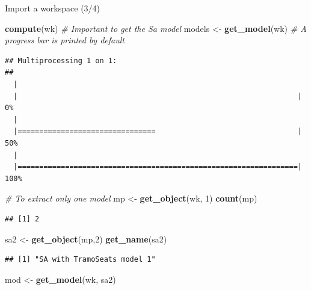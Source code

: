 \documentclass[10pt,xcolor=table,color={dvipsnames,usenames},ignorenonframetext,usepdftitle=false,french]{beamer}
\newenvironment{Shaded}{\begin{snugshade}}{\end{snugshade}}
\newcommand{\CommentTok}[1]{\textcolor[rgb]{0.56,0.35,0.01}{\textit{#1}}}
\newcommand{\DecValTok}[1]{\textcolor[rgb]{0.00,0.00,0.81}{#1}}
\newcommand{\KeywordTok}[1]{\textcolor[rgb]{0.13,0.29,0.53}{\textbf{#1}}}
\newcommand{\NormalTok}[1]{#1}
\newcommand{\StringTok}[1]{\textcolor[rgb]{0.31,0.60,0.02}{#1}}
\begin{document}
\begin{frame}[fragile]{Import a workspace (3/4)}
\protect\hypertarget{import-a-workspace-34}{}

\footnotesize

\begin{Shaded}
\begin{Highlighting}[]
\KeywordTok{compute}\NormalTok{(wk) }\CommentTok{# Important to get the Sa model}
\NormalTok{models <-}\StringTok{ }\KeywordTok{get_model}\NormalTok{(wk) }\CommentTok{# A progress bar is printed by default}
\end{Highlighting}
\end{Shaded}

\begin{verbatim}
## Multiprocessing 1 on 1:
## 
  |                                                                       
  |                                                                 |   0%
  |                                                                       
  |================================                                 |  50%
  |                                                                       
  |=================================================================| 100%
\end{verbatim}

\begin{Shaded}
\begin{Highlighting}[]
\CommentTok{# To extract only one model}
\NormalTok{mp <-}\StringTok{ }\KeywordTok{get_object}\NormalTok{(wk, }\DecValTok{1}\NormalTok{)}
\KeywordTok{count}\NormalTok{(mp)}
\end{Highlighting}
\end{Shaded}

\begin{verbatim}
## [1] 2
\end{verbatim}

\begin{Shaded}
\begin{Highlighting}[]
\NormalTok{sa2 <-}\StringTok{ }\KeywordTok{get_object}\NormalTok{(mp,}\DecValTok{2}\NormalTok{)}
\KeywordTok{get_name}\NormalTok{(sa2)}
\end{Highlighting}
\end{Shaded}

\begin{verbatim}
## [1] "SA with TramoSeats model 1"
\end{verbatim}

\begin{Shaded}
\begin{Highlighting}[]
\NormalTok{mod <-}\StringTok{ }\KeywordTok{get_model}\NormalTok{(wk, sa2)}
\end{Highlighting}
\end{Shaded}


\end{frame}
\end{document}
